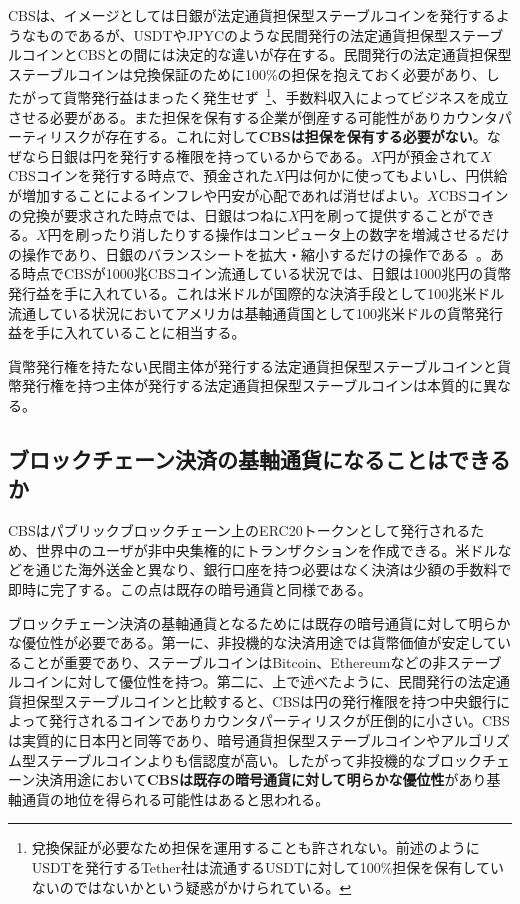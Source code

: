 \documentclass[dvipdfmx,a4paper]{jsarticle}
\begin{document}
CBSは、イメージとしては日銀が法定通貨担保型ステーブルコインを発行するようなものであるが、USDTやJPYCのような民間発行の法定通貨担保型ステーブルコインとCBSとの間には決定的な違いが存在する。民間発行の法定通貨担保型ステーブルコインは兌換保証のために100\%の担保を抱えておく必要があり、したがって貨幣発行益はまったく発生せず~\footnote{兌換保証が必要なため担保を運用することも許されない。前述のようにUSDTを発行するTether社は流通するUSDTに対して100\%担保を保有していないのではないかという疑惑がかけられている。}、手数料収入によってビジネスを成立させる必要がある。また担保を保有する企業が倒産する可能性がありカウンタパーティリスクが存在する。これに対して\textbf{CBSは担保を保有する必要がない}。なぜなら日銀は円を発行する権限を持っているからである。$X$円が預金されて$X$CBSコインを発行する時点で、預金された$X$円は何かに使ってもよいし、円供給が増加することによるインフレや円安が心配であれば消せばよい。$X$CBSコインの兌換が要求された時点では、日銀はつねに$X$円を刷って提供することができる。$X$円を刷ったり消したりする操作はコンピュータ上の数字を増減させるだけの操作であり、日銀のバランスシートを拡大・縮小するだけの操作である~\cite{mmt2016wray}。ある時点でCBSが1000兆CBSコイン流通している状況では、日銀は1000兆円の貨幣発行益を手に入れている。これは米ドルが国際的な決済手段として100兆米ドル流通している状況においてアメリカは基軸通貨国として100兆米ドルの貨幣発行益を手に入れていることに相当する。

貨幣発行権を持たない民間主体が発行する法定通貨担保型ステーブルコインと貨幣発行権を持つ主体が発行する法定通貨担保型ステーブルコインは本質的に異なる。

\subsection{ブロックチェーン決済の基軸通貨になることはできるか}

CBSはパブリックブロックチェーン上のERC20トークンとして発行されるため、世界中のユーザが非中央集権的にトランザクションを作成できる。米ドルなどを通じた海外送金と異なり、銀行口座を持つ必要はなく決済は少額の手数料で即時に完了する。この点は既存の暗号通貨と同様である。

ブロックチェーン決済の基軸通貨となるためには既存の暗号通貨に対して明らかな優位性が必要である。第一に、非投機的な決済用途では貨幣価値が安定していることが重要であり、ステーブルコインはBitcoin、Ethereumなどの非ステーブルコインに対して優位性を持つ。第二に、上で述べたように、民間発行の法定通貨担保型ステーブルコインと比較すると、CBSは円の発行権限を持つ中央銀行によって発行されるコインでありカウンタパーティリスクが圧倒的に小さい。CBSは実質的に日本円と同等であり、暗号通貨担保型ステーブルコインやアルゴリズム型ステーブルコインよりも信認度が高い。したがって非投機的なブロックチェーン決済用途において\textbf{CBSは既存の暗号通貨に対して明らかな優位性}があり基軸通貨の地位を得られる可能性はあると思われる。
\end{document}
